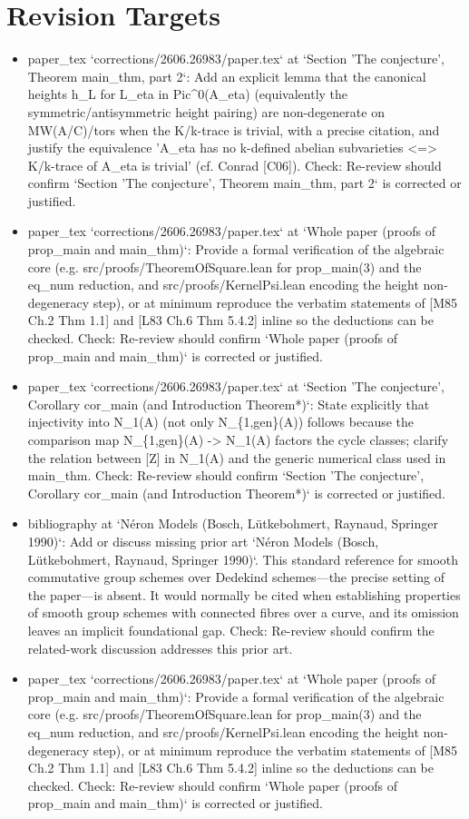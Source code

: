 \documentclass[11pt]{article}
\begin{document}
\section*{Revision Targets}
\begin{itemize}[leftmargin=*]
  \item [open] paper\_tex `corrections/2606.26983/paper.tex` at `Section 'The conjecture', Theorem main\_thm, part 2`: Add an explicit lemma that the canonical heights h\_L for L\_eta in Pic\^{}0(A\_eta) (equivalently the symmetric/antisymmetric height pairing) are non-degenerate on MW(A/C)/tors when the K/k-trace is trivial, with a precise citation, and justify the equivalence 'A\_eta has no k-defined abelian subvarieties <=> K/k-trace of A\_eta is trivial' (cf. Conrad [C06]). Check: Re-review should confirm `Section 'The conjecture', Theorem main\_thm, part 2` is corrected or justified.
  \item [open] paper\_tex `corrections/2606.26983/paper.tex` at `Whole paper (proofs of prop\_main and main\_thm)`: Provide a formal verification of the algebraic core (e.g. src/proofs/TheoremOfSquare.lean for prop\_main(3) and the eq\_num reduction, and src/proofs/KernelPsi.lean encoding the height non-degeneracy step), or at minimum reproduce the verbatim statements of [M85 Ch.2 Thm 1.1] and [L83 Ch.6 Thm 5.4.2] inline so the deductions can be checked. Check: Re-review should confirm `Whole paper (proofs of prop\_main and main\_thm)` is corrected or justified.
  \item [open] paper\_tex `corrections/2606.26983/paper.tex` at `Section 'The conjecture', Corollary cor\_main (and Introduction Theorem*)`: State explicitly that injectivity into N\_1(A) (not only N\_\{1,gen\}(A)) follows because the comparison map N\_\{1,gen\}(A) -> N\_1(A) factors the cycle classes; clarify the relation between [Z] in N\_1(A) and the generic numerical class used in main\_thm. Check: Re-review should confirm `Section 'The conjecture', Corollary cor\_main (and Introduction Theorem*)` is corrected or justified.
  \item [open] bibliography at `Néron Models (Bosch, Lütkebohmert, Raynaud, Springer 1990)`: Add or discuss missing prior art `Néron Models (Bosch, Lütkebohmert, Raynaud, Springer 1990)`. This standard reference for smooth commutative group schemes over Dedekind schemes---the precise setting of the paper---is absent. It would normally be cited when establishing properties of smooth group schemes with connected fibres over a curve, and its omission leaves an implicit foundational gap. Check: Re-review should confirm the related-work discussion addresses this prior art.
  \item [open] paper\_tex `corrections/2606.26983/paper.tex` at `Whole paper (proofs of prop\_main and main\_thm)`: Provide a formal verification of the algebraic core (e.g. src/proofs/TheoremOfSquare.lean for prop\_main(3) and the eq\_num reduction, and src/proofs/KernelPsi.lean encoding the height non-degeneracy step), or at minimum reproduce the verbatim statements of [M85 Ch.2 Thm 1.1] and [L83 Ch.6 Thm 5.4.2] inline so the deductions can be checked. Check: Re-review should confirm `Whole paper (proofs of prop\_main and main\_thm)` is corrected or justified.
\end{itemize}
\end{document}
